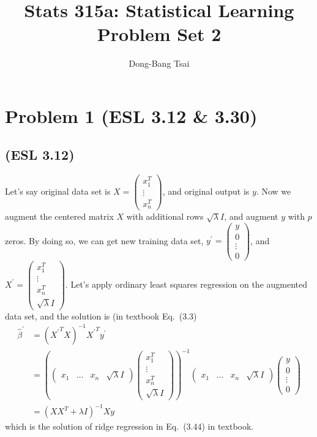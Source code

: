 \documentclass[pra,groupedaddress,amsmath,amssymb, column]{revtex4}
\begin{document}
\title{Stats 315a: Statistical Learning \\ Problem Set 2}
\author{Dong-Bang Tsai}



\maketitle


\section*{Problem 1 (ESL 3.12 \& 3.30)}
\subsection*{(ESL 3.12)}
Let's say original data set is $X=\left( \begin{array}{c}
	x_1^T\\ \vdots \\ x_n^T
\end{array} \right)$, and original output is $y$. Now we augment the centered matrix $X$ with additional rows $\sqrt{\lambda}I$, and augment $y$ with $p$ zeros. By doing so, we can get new training data set, $y^\prime=\left( \begin{array}{c}
	y\\ 0\\ \vdots \\ 0
\end{array} \right)$, and $X^\prime=\left( \begin{array}{c}
	x_1^T\\ \vdots \\ x_n^T \\ \sqrt{\lambda}I
\end{array} \right)$. Let's apply ordinary least squares regression on the augmented data set, and the solution is (in textbook Eq.~(3.3)
\begin{align}
\hat{\beta}^\prime &= ({X^\prime}^TX)^{-1}{X^\prime}^Ty^\prime \\
&=\left(\left( \begin{array}{cccc}
	x_1& \dots & x_n & \sqrt{\lambda}I
\end{array} \right)\left( \begin{array}{c}
	x_1^T\\ \vdots \\ x_n^T \\ \sqrt{\lambda}I
\end{array} \right)\right)^{-1}\left( \begin{array}{cccc}
	x_1& \dots & x_n & \sqrt{\lambda}I
\end{array} \right)\left( \begin{array}{c}
	y\\ 0\\ \vdots \\ 0
\end{array} \right) \\
&= \left( XX^T + {\lambda}I \right)^{-1}Xy
\end{align} which is the solution of ridge regression in Eq.~(3.44) in textbook. 
\end{document}
